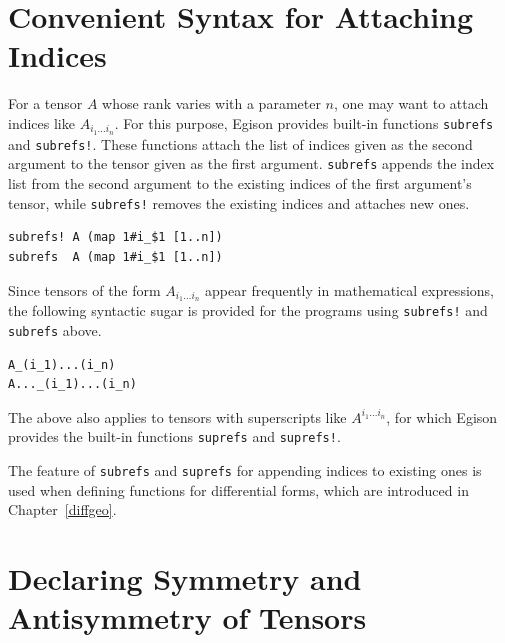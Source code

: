\section{Convenient Syntax for Attaching Indices}\label{tensor-refs}

For a tensor $A$ whose rank varies with a parameter $n$, one may want to attach indices like $A_{i_{1}...i_{n}}$.
For this purpose, Egison provides built-in functions \lstinline{subrefs} and \lstinline{subrefs!}.
These functions attach the list of indices given as the second argument to the tensor given as the first argument.
\lstinline{subrefs} appends the index list from the second argument to the existing indices of the first argument's tensor, while \lstinline{subrefs!} removes the existing indices and attaches new ones.
\begin{lstlisting}[language=egison,numbers=none]
subrefs! A (map 1#i_$1 [1..n])
subrefs  A (map 1#i_$1 [1..n])
\end{lstlisting}
Since tensors of the form $A_{i_{1}...i_{n}}$ appear frequently in mathematical expressions, the following syntactic sugar is provided for the programs using \lstinline{subrefs!} and \lstinline{subrefs} above.
\begin{lstlisting}[language=egison,numbers=none]
A_(i_1)...(i_n)
A..._(i_1)...(i_n)
\end{lstlisting}
The above also applies to tensors with superscripts like $A^{i_{1}...i_{n}}$, for which Egison provides the built-in functions \lstinline{suprefs} and \lstinline{suprefs!}.

The feature of \lstinline{subrefs} and \lstinline{suprefs} for appending indices to existing ones is used when defining functions for differential forms, which are introduced in Chapter~\ref{diffgeo}.

\section{Declaring Symmetry and Antisymmetry of Tensors}\label{tensor-symm}

